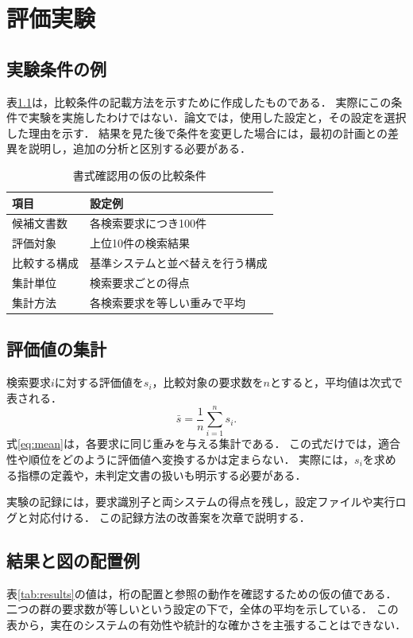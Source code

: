 \chapter{評価実験}
\label{sec:experiments}

\section{実験条件の例}
表\ref{tab:settings}は，比較条件の記載方法を示すために作成したものである．
実際にこの条件で実験を実施したわけではない．論文では，使用した設定と，その設定を選択した理由を示す．
結果を見た後で条件を変更した場合には，最初の計画との差異を説明し，追加の分析と区別する必要がある．

\begin{table}[htbp]
  \centering
  \caption{書式確認用の仮の比較条件}
  \label{tab:settings}
  \begin{tabular}{ll}\hline
    項目 & 設定例\\\hline
    候補文書数 & 各検索要求につき100件\\
    評価対象 & 上位10件の検索結果\\
    比較する構成 & 基準システムと並べ替えを行う構成\\
    集計単位 & 検索要求ごとの得点\\
    集計方法 & 各検索要求を等しい重みで平均\\\hline
  \end{tabular}
\end{table}

\section{評価値の集計}
検索要求$i$に対する評価値を$s_i$，比較対象の要求数を$n$とすると，平均値は次式で表される．
\begin{equation}
  \label{eq:mean}
  \bar{s}=\frac{1}{n}\sum_{i=1}^{n}s_i.
\end{equation}
式\eqref{eq:mean}は，各要求に同じ重みを与える集計である．
この式だけでは，適合性や順位をどのように評価値へ変換するかは定まらない．
実際には，$s_i$を求める指標の定義や，未判定文書の扱いも明示する必要がある．

実験の記録には，要求識別子と両システムの得点を残し，設定ファイルや実行ログと対応付ける．
この記録方法の改善案を次章で説明する．

\clearpage
\section{結果と図の配置例}
表\ref{tab:results}の値は，桁の配置と参照の動作を確認するための仮の値である．
二つの群の要求数が等しいという設定の下で，全体の平均を示している．
この表から，実在のシステムの有効性や統計的な確かさを主張することはできない．

